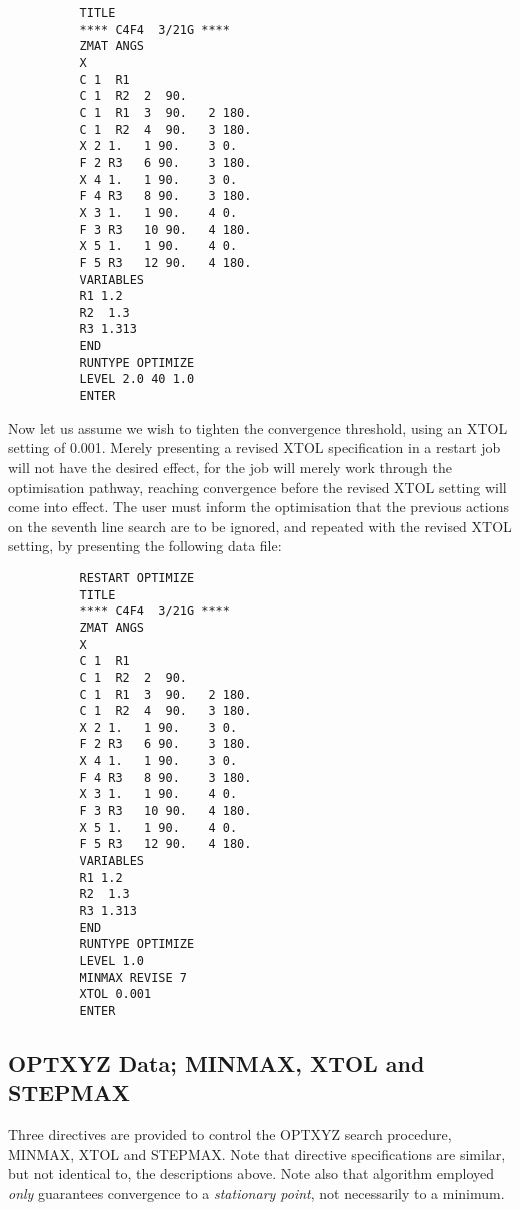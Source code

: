 \documentclass[11pt,fleqn]{article}
\begin{document}
{
\footnotesize
\begin{verbatim}
          TITLE  
          **** C4F4  3/21G ****
          ZMAT ANGS                   
          X
          C 1  R1
          C 1  R2  2  90.
          C 1  R1  3  90.   2 180.
          C 1  R2  4  90.   3 180.
          X 2 1.   1 90.    3 0.
          F 2 R3   6 90.    3 180.
          X 4 1.   1 90.    3 0.
          F 4 R3   8 90.    3 180.
          X 3 1.   1 90.    4 0.
          F 3 R3   10 90.   4 180.
          X 5 1.   1 90.    4 0.
          F 5 R3   12 90.   4 180.
          VARIABLES
          R1 1.2 
          R2  1.3 
          R3 1.313
          END
          RUNTYPE OPTIMIZE
          LEVEL 2.0 40 1.0 
          ENTER 
\end{verbatim}
}
Now let us assume we wish to tighten the convergence threshold,
using an XTOL setting of 0.001. Merely presenting a revised XTOL
specification in a restart job will not have the desired effect, for
the job will merely work through the optimisation pathway, reaching
convergence before the revised XTOL setting will come into effect.
The user must inform the optimisation that the previous actions
on the seventh line search are to be ignored, and repeated with
the revised XTOL setting, by presenting the following data file:

{
\footnotesize
\begin{verbatim}
          RESTART OPTIMIZE
          TITLE  
          **** C4F4  3/21G ****
          ZMAT ANGS                   
          X
          C 1  R1
          C 1  R2  2  90.
          C 1  R1  3  90.   2 180.
          C 1  R2  4  90.   3 180.
          X 2 1.   1 90.    3 0.
          F 2 R3   6 90.    3 180.
          X 4 1.   1 90.    3 0.
          F 4 R3   8 90.    3 180.
          X 3 1.   1 90.    4 0.
          F 3 R3   10 90.   4 180.
          X 5 1.   1 90.    4 0.
          F 5 R3   12 90.   4 180.
          VARIABLES
          R1 1.2 
          R2  1.3 
          R3 1.313
          END
          RUNTYPE OPTIMIZE
          LEVEL 1.0
          MINMAX REVISE 7
          XTOL 0.001
          ENTER  
\end{verbatim}
}

\subsection[OPTXYZ Data; MINMAX, XTOL and STEPMAX ]{OPTXYZ Data; MINMAX, XTOL and STEPMAX }

Three directives are provided to control the OPTXYZ search procedure, 
MINMAX, XTOL and  STEPMAX. Note that directive specifications are
similar, but not identical to, the descriptions above. Note also that
algorithm employed {\em only} guarantees convergence to a 
{\em stationary point}, not necessarily to a minimum.
\end{document}
